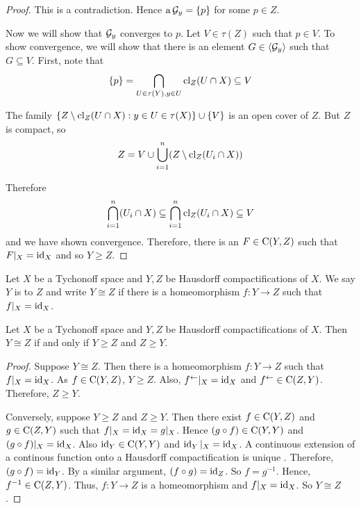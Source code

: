 \begin{proof}
	This is a contradiction.  Hence \( \operatorname{a}{\mathcal{G}_y} = \{ p \} \) for some \( p \in Z \).
	
	Now we will show that \( \mathcal{G}_y \) converges to \( p \). 	Let \( V \in \tau(Z) \) such that \( p \in V \).  To show convergence, we will show that there is an element \( G \in \langle \mathcal{G}_y \rangle \) such that \( G \subseteq V \).  First, note that
	\[ \{p\} = \bigcap_{U \in \tau(Y),y \in U} \operatorname{cl}_Z(U \cap X) \subseteq V \]
	
	The family \( \{ Z \setminus \operatorname{cl}_Z(U \cap X) : y \in U \in \tau(X) \} \cup \{ V \} \) is an open cover of \( Z \).  But \( Z \) is compact, so
	\[ Z = V \cup \bigcup_{i=1}^n (Z \setminus \operatorname{cl}_Z(U_i \cap X)) \]
	
	Therefore
	\[ \bigcap_{i=1}^n (U_i \cap X) \subseteq \bigcap_{i=1}^n \operatorname{cl}_Z(U_i \cap X) \subseteq V \]
	and we have shown convergence.  Therefore, there is an \( F \in \operatorname{C}(Y,Z) \) such that \( F|_X = \operatorname{id}_X \) and so \( Y \geq Z \).
\end{proof}

\begin{definition}
	Let \( X \) be a Tychonoff space and \( Y,Z \) be Hausdorff compactifications of \( X \).  We say \( Y \) is  to \( Z \) and write \( Y \cong Z \) if there is a homeomorphism \( f:Y \to Z \) such that \( f|_X = \operatorname{id}_X \).
\end{definition}

\begin{proposition}
	\label{isomgeq}
	Let \( X \) be a Tychonoff space and \( Y,Z \) be Hausdorff compactifications of \( X \).  Then \( Y \cong Z \) if and only if \( Y \geq Z \) and \( Z \geq Y \).
\end{proposition}
\begin{proof}
	Suppose \( Y \cong Z \).  Then there is a homeomorphism \( f:Y \to Z \) such that \( f|_X = \operatorname{id}_X \).  As \( f \in \operatorname{C}(Y,Z) \), \( Y \geq Z \).  Also, \( f^\leftarrow|_X = \operatorname{id}_X \) and \( f^\leftarrow \in \operatorname{C}(Z,Y) \).  Therefore, \( Z \geq Y \).
	
	Conversely, suppose \( Y \geq Z \) and \( Z \geq Y \).  Then there exist \( f \in \operatorname{C}(Y,Z) \) and \( g \in \operatorname{C}(Z,Y) \) such that \( f|_X = \operatorname{id}_X = g|_X \).  Hence \( (g \circ f) \in \operatorname{C}(Y,Y) \) and \( (g \circ f)|_X = \operatorname{id}_X \).  Also \( \operatorname{id}_Y \in \operatorname{C}(Y,Y) \) and \( \operatorname{id}_Y|_X = \operatorname{id}_X \).  A continuous extension of a continous function onto a Hausdorff compactification is unique \cite[1.6(d)]{porter}.  Therefore, \( (g \circ f) = \operatorname{id}_Y \).  By a similar argument, \( (f \circ g) = \operatorname{id}_Z \).  So \( f = g^{-1} \).  Hence, \( f^{-1} \in \operatorname{C}(Z,Y) \).  Thus, \( f:Y \to Z \) is a homeomorphism and \( f|_X = \operatorname{id}_X \).  So \( Y \cong Z \).
\end{proof}

